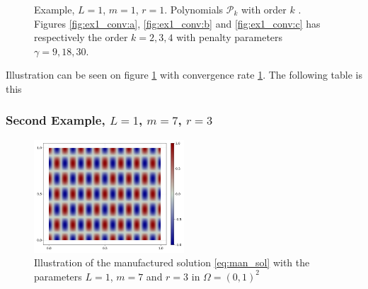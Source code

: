 \begin{figure}
    \caption{ Example, $L=1$, $m=1$, $r=1$. Polynomials $\mathcal{P}_{k} $ with order $k$ . Figures \ref{fig:ex1_conv:a}, \ref{fig:ex1_conv:b} and \ref{fig:ex1_conv:c} has respectively the order $k=2,3, 4$ with penalty parameters $\gamma = 9,18,30 $.  }
    \label{fig:ex1_conv}
\end{figure}

Illustration can be seen on figure \ref{fig:ex1_conv} with convergence rate \ref{fig:ex1_conv}. The following table is this






\subsubsection{Second Example, $L=1$, $m=7$, $r=3$}%
\label{sub:second_example}

\begin{figure}[tbh!]
    \centering
    \includegraphics[width=0.5\textwidth]{figures/model/l_1.0_m_7_r_3n_100_sol.png}
    \caption{Illustration of the manufactured solution \eqref{eq:man_sol}   with the parameters $L=1$, $m=7$ and $r=3$ in $\Omega = (0,1)^2$}
    \label{fig:sol_l1_m7_r3}
\end{figure}

